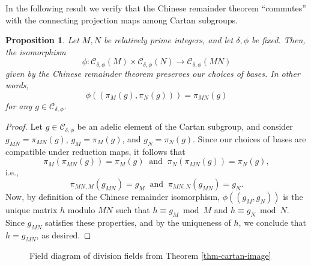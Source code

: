 \documentclass[11pt]{amsart}
\newtheorem{prop}[defn]{Proposition}
\theoremstyle{definition}
\newcommand{\arrow}{\longrightarrow}
\begin{document}
In the following result we verify that the Chinese remainder theorem ``commutes'' with the connecting projection maps among Cartan subgroups.

\begin{prop}\label{prop-CRTcompatible}
    Let $M,N$ be relatively prime integers, and let $\delta,\phi$ be fixed. Then, the isomorphism
    $$\phi\colon \mathcal{C}_{\delta, \phi}(M)\times \mathcal{C}_{\delta, \phi}(N) \to \mathcal{C}_{\delta, \phi}(MN)$$
    given by the Chinese remainder theorem preserves our choices of bases. In other words, 
    $$\phi((\pi_{M}(g),\pi_N(g)))=\pi_{MN}(g)$$
    for any $g\in \mathcal{C}_{\delta, \phi}$.
\end{prop}
\begin{proof}
    Let $g\in \mathcal{C}_{\delta, \phi}$ be an adelic element of the Cartan subgroup, and consider $g_{MN}=\pi_{MN}(g)$, $g_M=\pi_M(g)$, and $g_N=\pi_N(g)$. Since our choices of bases are compatible under reduction maps, it follows that 
    $$\pi_M(\pi_{MN}(g)) = \pi_M(g) \ \text{ and } \ \pi_N(\pi_{MN}(g)) = \pi_N(g),$$
    i.e.,
    $$\pi_{MN,M}(g_{MN})=g_M \ \text{ and } \ \pi_{MN,N}(g_{MN})=g_N.$$
    Now, by definition of the Chinese remainder isomorphism, $\phi((g_M,g_N))$ is the unique matrix $h$ modulo $MN$ such that $h\equiv g_M \bmod M$ and $h\equiv g_N \bmod N$. Since $g_{MN}$ satisfies these properties, and by the uniqueness of $h$, we conclude that $h=g_{MN}$, as desired.
\end{proof}

\begin{figure}
    \centering 
{}
\caption{Field diagram of division fields from Theorem \ref{thm-cartan-image}}
\label{fig-fielddiagram}
\end{figure}
\end{document}
